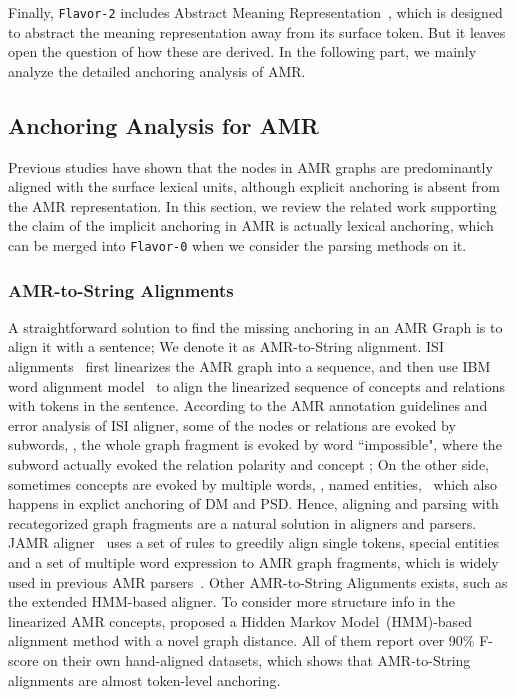Finally, \texttt{Flavor-2} includes Abstract Meaning
Representation~\cite[AMR,][]{Ban:Bon:Cai:13}, which is designed to
abstract the meaning representation away from its surface token. But
it leaves open the question of how these are derived. In the following
part, we mainly analyze the detailed anchoring analysis of AMR.

\subsection{Anchoring Analysis for AMR}
\label{ssec:lex-phr:amr-anchor}
Previous studies have shown that the nodes in AMR graphs are
predominantly aligned with the surface lexical units, although
explicit anchoring is absent from the AMR representation.  In this
section, we review the related work supporting the claim of the
implicit anchoring in AMR is actually lexical anchoring, which can be
merged into \texttt{Flavor-0} when we consider the parsing methods on
it.

\subsubsection{AMR-to-String Alignments}
\label{sssec:lex-phr:amr-to-string}
A straightforward solution to find the missing anchoring in an AMR
Graph is to align it with a sentence; We denote it as AMR-to-String
alignment. ISI alignments~\cite{Pourdamghani:2014aligning} first
linearizes the AMR graph into a sequence, and then use IBM word
alignment model~\cite{brown1993mathematics} to align the linearized
sequence of concepts and relations with tokens in the
sentence. According to the AMR annotation guidelines and error
analysis of ISI aligner, some of the nodes or relations are evoked by
subwords, \eg, the whole graph fragment  is evoked by word ``impossible", where the subword
 actually evoked the relation polarity and concept
\tquoted{-}; On the other side, sometimes concepts are evoked by
multiple words, \eg, named entities, ~which also happens in explict anchoring
of DM and PSD. Hence, aligning and parsing with recategorized graph
fragments are a natural solution in aligners and parsers. JAMR
aligner~\cite{Flanigan:2014vc} uses a set of rules to greedily align
single tokens, special entities and a set of multiple word expression
to AMR graph fragments, which is widely used in previous AMR
parsers~\cite[\eg,][]{Flanigan:2014vc,Wang:2015uo,Artzi:2009tb,Pust:2015ug,Peng:2015tj,Konstas:2017uj,Wang:2017vt}. Other
AMR-to-String Alignments exists, such as the extended HMM-based
aligner. To consider more structure info in the linearized AMR
concepts, \citet{Wang:2017vt} proposed a Hidden Markov
Model~(HMM)-based alignment method with a novel graph distance. All of
them report over 90\% F-score on their own hand-aligned datasets,
which shows that AMR-to-String alignments are almost token-level
anchoring.

